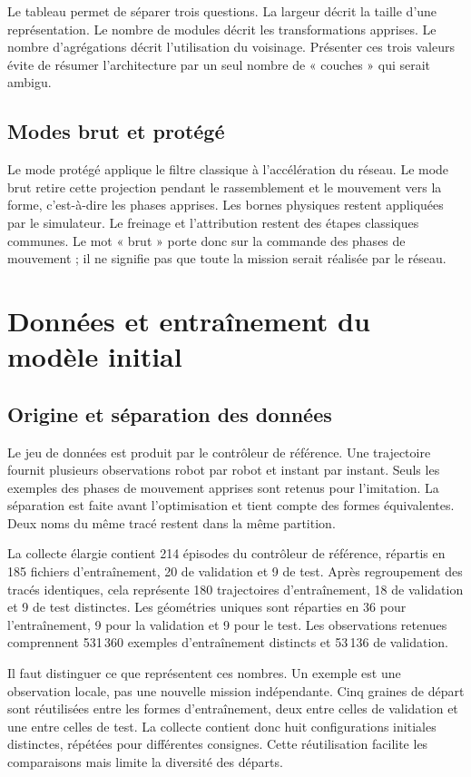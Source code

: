 Le tableau permet de séparer trois questions. La largeur décrit la taille d'une représentation. Le nombre de modules décrit les transformations apprises. Le nombre d'agrégations décrit l'utilisation du voisinage. Présenter ces trois valeurs évite de résumer l'architecture par un seul nombre de « couches » qui serait ambigu.

\subsection{Modes brut et protégé}
Le mode protégé applique le filtre classique à l'accélération du réseau. Le mode brut retire cette projection pendant le rassemblement et le mouvement vers la forme, c'est-à-dire les phases apprises. Les bornes physiques restent appliquées par le simulateur. Le freinage et l'attribution restent des étapes classiques communes. Le mot « brut » porte donc sur la commande des phases de mouvement ; il ne signifie pas que toute la mission serait réalisée par le réseau.

\section{Données et entraînement du modèle initial}
\subsection{Origine et séparation des données}
Le jeu de données est produit par le contrôleur de référence. Une trajectoire fournit plusieurs observations robot par robot et instant par instant. Seuls les exemples des phases de mouvement apprises sont retenus pour l'imitation. La séparation est faite avant l'optimisation et tient compte des formes équivalentes. Deux noms du même tracé restent dans la même partition.

La collecte élargie contient 214 épisodes du contrôleur de référence, répartis en 185 fichiers d'entraînement, 20 de validation et 9 de test. Après regroupement des tracés identiques, cela représente 180 trajectoires d'entraînement, 18 de validation et 9 de test distinctes. Les géométries uniques sont réparties en 36 pour l'entraînement, 9 pour la validation et 9 pour le test. Les observations retenues comprennent 531\,360 exemples d'entraînement distincts et 53\,136 de validation.

Il faut distinguer ce que représentent ces nombres. Un exemple est une observation locale, pas une nouvelle mission indépendante. Cinq graines de départ sont réutilisées entre les formes d'entraînement, deux entre celles de validation et une entre celles de test. La collecte contient donc huit configurations initiales distinctes, répétées pour différentes consignes. Cette réutilisation facilite les comparaisons mais limite la diversité des départs.


